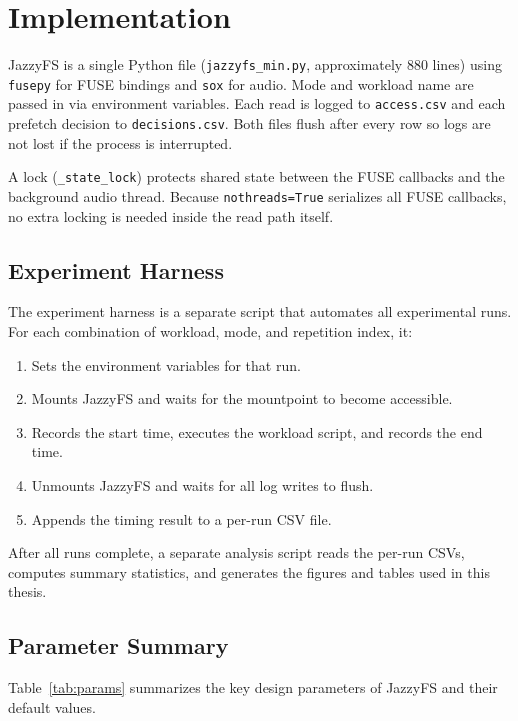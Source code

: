 \documentclass[12pt]{report}
\begin{document}
\section{Implementation}
\label{sec:design-impl}

JazzyFS is a single Python file (\texttt{jazzyfs\_min.py}, approximately
880 lines) using \texttt{fusepy} for FUSE bindings and \texttt{sox} for
audio. Mode and workload name are passed in via environment variables.
Each read is logged to \texttt{access.csv} and each prefetch decision to
\texttt{decisions.csv}. Both files flush after every row so logs are not
lost if the process is interrupted.

A lock (\texttt{\_state\_lock}) protects shared state between the FUSE
callbacks and the background audio thread. Because \texttt{nothreads=True}
serializes all FUSE callbacks, no extra locking is needed inside the read
path itself.

\subsection{Experiment Harness}

The experiment harness is a separate script that automates all experimental
runs. For each combination of workload, mode, and repetition index, it:
\begin{enumerate}
    \item Sets the environment variables for that run.
    \item Mounts JazzyFS and waits for the mountpoint to become accessible.
    \item Records the start time, executes the workload script, and records
    the end time.
    \item Unmounts JazzyFS and waits for all log writes to flush.
    \item Appends the timing result to a per-run CSV file.
\end{enumerate}

After all runs complete, a separate analysis script reads the per-run CSVs,
computes summary statistics, and generates the figures and tables used in
this thesis.

\subsection{Parameter Summary}

Table~\ref{tab:params} summarizes the key design parameters of JazzyFS and
their default values.
\end{document}
